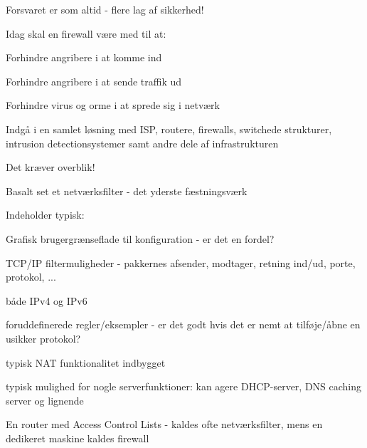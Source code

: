 \documentclass[Screen16to9,17pt]{foils}
\begin{document}
\centerline{\hlkbig Forsvaret er som altid - flere lag af sikkerhed! }





\begin{list1}
\item Idag skal en firewall være med til at:
\begin{list2}
\item Forhindre angribere i at komme ind
\item Forhindre angribere i at sende traffik ud
\item Forhindre virus og orme i at sprede sig i netværk
\item Indgå i en samlet løsning med ISP, routere, firewalls, switchede
  strukturer, intrusion detectionsystemer samt andre dele af infrastrukturen
\end{list2}
\item Det kræver overblik!
\end{list1}




\begin{list1}
\item Basalt set et netværksfilter - det yderste fæstningsværk
\item Indeholder typisk:
  \begin{list2}
   \item Grafisk brugergrænseflade til konfiguration - er det en
   fordel?
\item TCP/IP filtermuligheder - pakkernes afsender, modtager, retning
  ind/ud, porte, protokol, ...
\item både IPv4 og IPv6
\item foruddefinerede regler/eksempler - er det godt hvis det er nemt
  at tilføje/åbne en usikker protokol?
\item typisk NAT funktionalitet indbygget
\item typisk mulighed for nogle serverfunktioner: kan agere
  DHCP-server, DNS caching server og lignende
  \end{list2}
\item En router med Access Control Lists - kaldes ofte netværksfilter,
  mens en dedikeret maskine kaldes firewall
\end{list1}
\end{document}
